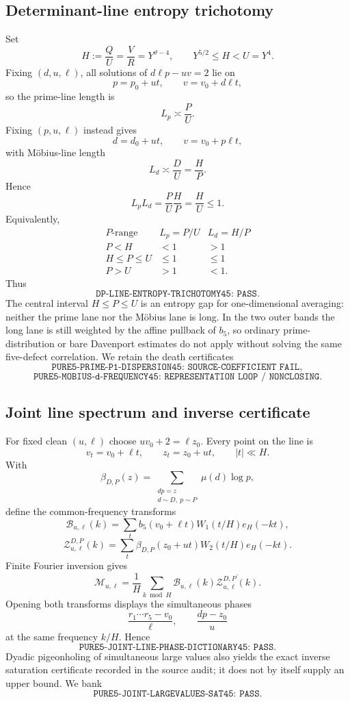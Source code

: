 \documentclass[11pt]{article}
\theoremstyle{definition}
\newcommand{\1}{\mathbf 1}
\begin{document}
\subsection{Determinant-line entropy trichotomy}
Set
\[
 H:=\frac QU=\frac VR=Y^{\vartheta-4},
 \qquad Y^{5/2}\le H<U=Y^4.
\]
Fixing $(d,u,\ell)$, all solutions of $d\ell p-uv=2$ lie on
\[
 p=p_0+ut,\qquad v=v_0+d\ell t,
\]
so the prime-line length is
\[
 L_p\asymp \frac PU.
\]
Fixing $(p,u,\ell)$ instead gives
\[
 d=d_0+ut,\qquad v=v_0+p\ell t,
\]
with M\"obius-line length
\[
 L_d\asymp \frac DU=\frac HP.
\]
Hence
\begin{equation}
 \boxed{L_pL_d=\frac PU\frac HP=\frac HU\le1.}
 \label{eq:d15-entropy-product}
\end{equation}
Equivalently,
\[
\begin{array}{c|c|c}
P\text{-range}&L_p=P/U&L_d=H/P\\ \hline
P<H&<1&>1\\
H\le P\le U&\le1&\le1\\
P>U&>1&<1.
\end{array}
\]
Thus
\[
 \boxed{\texttt{DP-LINE-ENTROPY-TRICHOTOMY45: PASS}}.
\]
The central interval $H\le P\le U$ is an entropy gap for one-dimensional
averaging: neither the prime lane nor the M\"obius lane is long.  In the two
outer bands the long lane is still weighted by the affine pullback of $b_5$,
so ordinary prime-distribution or bare Davenport estimates do not apply
without solving the same five-defect correlation.  We retain the death
certificates
\[
 \boxed{\texttt{PURE5-PRIME-P1-DISPERSION45: SOURCE-COEFFICIENT FAIL}},
\]
\[
 \boxed{\texttt{PURE5-MOBIUS-d-FREQUENCY45: REPRESENTATION LOOP / NONCLOSING}}.
\]

\subsection{Joint line spectrum and inverse certificate}
For fixed clean $(u,\ell)$ choose $uv_0+2=\ell z_0$.  Every point on the
line is
\[
 v_t=v_0+\ell t,\qquad z_t=z_0+ut,\qquad |t|\ll H.
\]
With
\[
 \beta_{D,P}(z)=\sum_{\substack{dp=z\\d\sim D,\ p\sim P}}\mu(d)\log p,
\]
define the common-frequency transforms
\[
 \mathcal B_{u,\ell}(k)
 =\sum_tb_5(v_0+\ell t)W_1(t/H)e_H(-kt),
\]
\[
 \mathcal Z^{D,P}_{u,\ell}(k)
 =\sum_t\beta_{D,P}(z_0+ut)W_2(t/H)e_H(-kt).
\]
Finite Fourier inversion gives
\begin{equation}
 \boxed{
 \mathcal M_{u,\ell}=\frac1H\sum_{k\bmod H}
 \mathcal B_{u,\ell}(k)\overline{\mathcal Z^{D,P}_{u,\ell}(k)}.
 }
 \label{eq:d15-line-dft}
\end{equation}
Opening both transforms displays the simultaneous phases
\[
 \frac{r_1\cdots r_5-v_0}{\ell},\qquad
 \frac{dp-z_0}{u}
\]
at the same frequency $k/H$.  Hence
\[
 \boxed{\texttt{PURE5-JOINT-LINE-PHASE-DICTIONARY45: PASS}}.
\]
Dyadic pigeonholing of simultaneous large values also yields the exact inverse
saturation certificate recorded in the source audit; it does not by itself
supply an upper bound.  We bank
\[
 \boxed{\texttt{PURE5-JOINT-LARGEVALUES-SAT45: PASS}}.
\]
\end{document}
